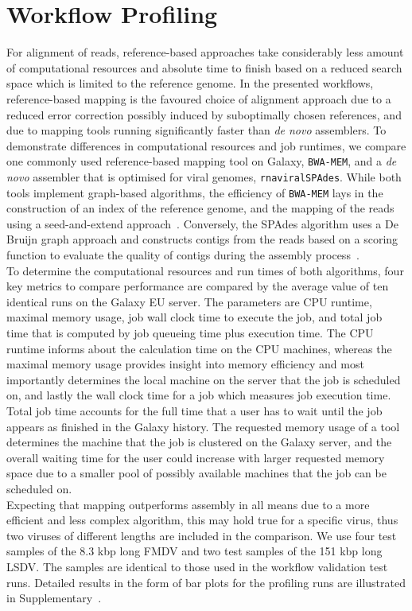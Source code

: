 \section{Workflow Profiling}
For alignment of reads, reference-based approaches take considerably less amount of computational resources and absolute time to finish based on a reduced search space which is limited to the reference genome. In the presented workflows, reference-based mapping is the favoured choice of alignment approach due to a reduced error correction possibly induced by suboptimally chosen references, and due to mapping tools running significantly faster than \textit{de novo} assemblers. To demonstrate differences in computational resources and job runtimes, we compare one commonly used reference-based mapping tool on Galaxy, \texttt{BWA-MEM}, and a \textit{de novo} assembler that is optimised for viral genomes, \texttt{rnaviralSPAdes}. While both tools implement graph-based algorithms, the efficiency of \texttt{BWA-MEM} lays in the construction of an index of the reference genome, and the mapping of the reads using a seed-and-extend approach~\cite{li2013aligning}. Conversely, the SPAdes algorithm uses a De Bruijn graph approach and constructs contigs from the reads based on a scoring function to evaluate the quality of contigs during the assembly process~\cite{bankevich2012spades}.\\
To determine the computational resources and run times of both algorithms, four key metrics to compare performance are compared by the average value of ten identical runs on the Galaxy EU server. The parameters are CPU runtime, maximal memory usage, job wall clock time to execute the job, and total job time that is computed by job queueing time plus execution time. The CPU runtime informs about the calculation time on the CPU machines, whereas the maximal memory usage provides insight into memory efficiency and most importantly determines the local machine on the server that the job is scheduled on, and lastly the wall clock time for a job which measures job execution time. Total job time accounts for the full time that a user has to wait until the job appears as finished in the Galaxy history. The requested memory usage of a tool determines the machine that the job is clustered on the Galaxy server, and the overall waiting time for the user could increase with larger requested memory space due to a smaller pool of possibly available machines that the job can be scheduled on.\\
Expecting that mapping outperforms assembly in all means due to a more efficient and less complex algorithm, this may hold true for a specific virus, thus two viruses of different lengths are included in the comparison. We use four test samples of the 8.3 kbp long \ac{FMDV} and two test samples of the 151 kbp long \ac{LSDV}. The samples are identical to those used in the workflow validation test runs. Detailed results in the form of bar plots for the profiling runs are illustrated in Supplementary~. \\

